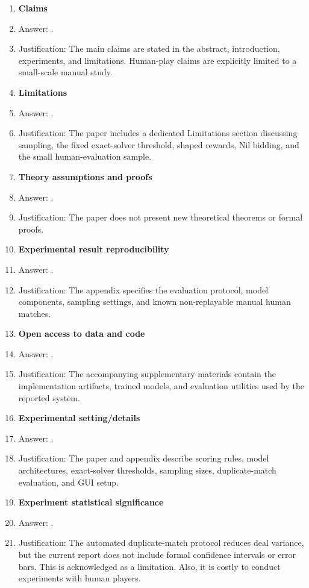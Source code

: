 \documentclass{article}
\begin{document}
\begin{enumerate}
\item {\bf Claims}
    \item[] Answer: \answerYes{}.
    \item[] Justification: The main claims are stated in the abstract, introduction, experiments, and limitations. Human-play claims are explicitly limited to a small-scale manual study.

\item {\bf Limitations}
    \item[] Answer: \answerYes{}.
    \item[] Justification: The paper includes a dedicated Limitations section discussing sampling, the fixed exact-solver threshold, shaped rewards, Nil bidding, and the small human-evaluation sample.

\item {\bf Theory assumptions and proofs}
    \item[] Answer: \answerNA{}.
    \item[] Justification: The paper does not present new theoretical theorems or formal proofs.

\item {\bf Experimental result reproducibility}
    \item[] Answer: \answerYes{}.
    \item[] Justification: The appendix specifies the evaluation protocol, model components, sampling settings, and known non-replayable manual human matches.

\item {\bf Open access to data and code}
    \item[] Answer: \answerYes{}.
    \item[] Justification: The accompanying supplementary materials contain the implementation artifacts, trained models, and evaluation utilities used by the reported system.

\item {\bf Experimental setting/details}
    \item[] Answer: \answerYes{}.
    \item[] Justification: The paper and appendix describe scoring rules, model architectures, exact-solver thresholds, sampling sizes, duplicate-match evaluation, and GUI setup.

\item {\bf Experiment statistical significance}
    \item[] Answer: \answerNo{}.
    \item[] Justification: The automated duplicate-match protocol reduces deal variance, but the current report does not include formal confidence intervals or error bars. This is acknowledged as a limitation. Also, it is costly to conduct experiments with human players.


\end{enumerate}
\end{document}
